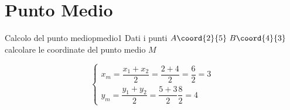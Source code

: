 \chapter{Punto Medio}
\begin{esempiot}{Calcolo del punto medio}{pmedio1}
	Dati i punti $A\coord{2}{5}$\,$B\coord{4}{3}$ calcolare le coordinate del punto medio $M$
\end{esempiot}
\begin{equation*}
\begin{cases}
	x_m=\dfrac{x_1+x_2}{2}=\dfrac{2+4}{2}=\dfrac{6}{2}=3\\[0.8cm]
	y_m=\dfrac{y_1+y_2}{2}=\dfrac{5+3}{2}\dfrac{8}{2}=4
\end{cases}
\end{equation*}